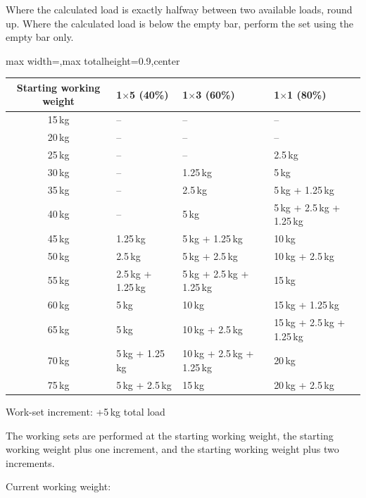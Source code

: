 \documentclass[11pt,a4paper]{article}
\newcommand{\tablearraystretch}{1.15}
\begin{document}
Where the calculated load is exactly halfway between two available loads, round up. Where the calculated load is below the empty bar, perform the set using the empty bar only.

\begin{center}
\renewcommand{\arraystretch}{\tablearraystretch}
\begin{adjustbox}{max width=\linewidth,max totalheight=0.9\textheight,center}
\begin{tabular}{c p{4cm} p{4cm} p{4cm}}
\toprule
Starting working weight &
1$\times$5 (40\%) &
1$\times$3 (60\%) &
1$\times$1 (80\%) \\
\midrule
15\,kg   & -- & -- & -- \\
20\,kg   & -- & -- & -- \\
25\,kg   & -- & -- & 2.5\,kg \\
30\,kg   & -- & 1.25\,kg & 5\,kg \\
35\,kg   & -- & 2.5\,kg & 5\,kg + 1.25\,kg \\
40\,kg   & -- & 5\,kg & 5\,kg + 2.5\,kg + 1.25\,kg \\
45\,kg   & 1.25\,kg & 5\,kg + 1.25\,kg & 10\,kg \\
50\,kg   & 2.5\,kg & 5\,kg + 2.5\,kg & 10\,kg + 2.5\,kg \\
55\,kg   & 2.5\,kg + 1.25\,kg & 5\,kg + 2.5\,kg + 1.25\,kg & 15\,kg \\
60\,kg   & 5\,kg & 10\,kg & 15\,kg + 1.25\,kg \\
65\,kg   & 5\,kg & 10\,kg + 2.5\,kg & 15\,kg + 2.5\,kg + 1.25\,kg \\
70\,kg   & 5\,kg + 1.25\,kg & 10\,kg + 2.5\,kg + 1.25\,kg & 20\,kg \\
75\,kg   & 5\,kg + 2.5\,kg & 15\,kg & 20\,kg + 2.5\,kg \\
\bottomrule
\end{tabular}
\end{adjustbox}
\renewcommand{\arraystretch}{1}
\end{center}

Work-set increment: +5\,kg total load

The working sets are performed at the starting working weight, the starting working weight plus one increment, and the starting working weight plus two increments.

Current working weight:
\end{document}
